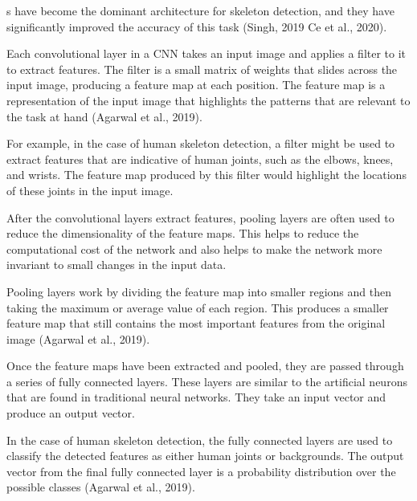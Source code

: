 \CNN\-s have become the dominant architecture for skeleton detection, and they have significantly improved the accuracy of this task (\scc Singh, 2019\; \scc Ce et al., 2020).


Each convolutional layer in a CNN takes an input image and applies a filter to it to extract features. The filter is a small matrix of weights that slides across the input image, producing a feature map at each position. The feature map is a representation of the input image that highlights the patterns that are relevant to the task at hand (\scc Agarwal et al., 2019).

For example, in the case of human skeleton detection, a filter might be used to extract features that are indicative of human joints, such as the elbows, knees, and wrists. The feature map produced by this filter would highlight the locations of these joints in the input image.


After the convolutional layers extract features, pooling layers are often used to reduce the dimensionality of the feature maps. This helps to reduce the computational cost of the network and also helps to make the network more invariant to small changes in the input data.

Pooling layers work by dividing the feature map into smaller regions and then taking the maximum or average value of each region. This produces a smaller feature map that still contains the most important features from the original image (\scc Agarwal et al., 2019).


Once the feature maps have been extracted and pooled, they are passed through a series of fully connected layers. These layers are similar to the artificial neurons that are found in traditional neural networks. They take an input vector and produce an output vector.

In the case of human skeleton detection, the fully connected layers are used to classify the detected features as either human joints or backgrounds. The output vector from the final fully connected layer is a probability distribution over the possible classes (\scc Agarwal et al., 2019).

